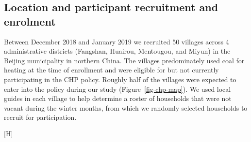 \documentclass[
  letterpaper,
  DIV=11,
  numbers=noendperiod]{scrartcl}
\makeatletter
\renewenvironment{figure}%
   {\renewcommand\familydefault\sfdefault
    \@float{figure}}
   {\end@float}
\makeatother
\begin{document}
\subsection{Location and participant recruitment and
enrolment}\label{location-and-participant-recruitment-and-enrolment}

Between December 2018 and January 2019 we recruited 50 villages across 4
administrative districts (Fangshan, Huairou, Mentougou, and Miyun) in
the Beijing municipality in northern China. The villages predominately
used coal for heating at the time of enrollment and were eligible for
but not currently participating in the CHP policy. Roughly half of the
villages were expected to enter into the policy during our study
 (Figure~\ref{fig-chp-map}). We used local guides in
each village to help determine a roster of households that were not
vacant during the winter months, from which we randomly selected
households to recruit for participation.

\begin{figure}[H]


\caption{\label{fig-chp-map}Map of village implementation of CBHP
policy. Each circle represents one recruited village. The colors of the
circles indicate the year the villages were exposed to the household
energy transition policy.}

\end{figure}%
\end{document}
